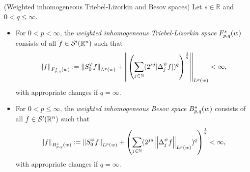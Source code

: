 \begin{dfn}{(Weighted inhomogeneous Triebel-Lizorkin and Besov spaces)}\label{ITL_B_def}
Let $s\in\mathbb{R}$ and $0<q\leq\infty$.
\begin{itemize}
\item For $0<p<\infty$, the \textit{weighted inhomogeneous Triebel-Lizorkin space} $\itlw{p}{s}{q}{w}$ consists of all $f\in\mathcal{S}'(\rn)$ such that
\begin{equation*}
\norm{f}{\itlw{p}{s}{q}{w}}:= \norm{S^\varphi_0 f}{L^p(w)} + \norm{\left(\sum_{j\in\na}(2^{sj}|\Delta^\psi_jf|)^q\right)^{\frac{1}{q}}}{\lebw{p}{w}}<\infty,
\end{equation*}
with appropriate changes if $q=\infty$.
\item For $0<p\leq\infty$, the \textit{weighted inhomogeneous Besov space} $\ibesw{p}{s}{q}{w}$ consists of all $f\in\mathcal{S}'(\rn)$ such that 
\begin{equation*}
\norm{f}{\ibesw{p}{s}{q}{w}}: = \norm{S^\varphi_0 f}{L^p(w)} + \left(\sum_{j\in\na} (2^{js}\norm{\Delta^\psi_jf}{L^p(w)})^q\right)^{\frac{1}{q}} < \infty,
\end{equation*}
with appropriate changes if $q=\infty$.
\end{itemize}
\end{dfn}

